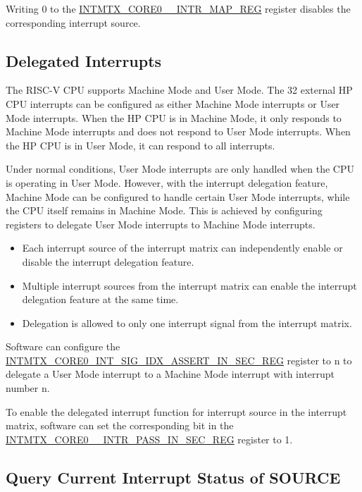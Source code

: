 \documentclass[main\_\_EN.tex]{subfiles}
\begin{document}
Writing 0 to the \hyperref[INTMTXCORE0SOURCEINTRMAPREG]{INTMTX\_CORE0\_\_INTR\_MAP\_REG} register disables the corresponding interrupt source.

\subsection{Delegated Interrupts}

The \chipname{} RISC-V CPU supports Machine Mode and User Mode. The 32 external HP CPU interrupts can be configured as either Machine Mode interrupts or User Mode interrupts. When the HP CPU is in Machine Mode, it only responds to Machine Mode interrupts and does not respond to User Mode interrupts. When the HP CPU is in User Mode, it can respond to all interrupts.

Under normal conditions, User Mode interrupts are only handled when the CPU is operating in User Mode. However, with the interrupt delegation feature, Machine Mode can be configured to handle certain User Mode interrupts, while the CPU itself remains in Machine Mode. This is achieved by configuring registers to delegate User Mode interrupts to Machine Mode interrupts.

\begin{itemize}
\item Each interrupt source of the interrupt matrix can independently enable or disable the interrupt delegation feature.
\item Multiple interrupt sources from the interrupt matrix can enable the interrupt delegation feature at the same time.
\item Delegation is allowed to only one interrupt signal from the interrupt matrix.
\end{itemize}

Software can configure the \hyperref[regdesc:INTMTXCORE0INTSIGIDXASSERTINSECREG]{INTMTX\_CORE0\_INT\_SIG\_IDX\_ASSERT\_IN\_SEC\_REG} register to n to delegate a User Mode interrupt to a Machine Mode interrupt with interrupt number n.

To enable the delegated interrupt function for interrupt source  in the interrupt matrix, software can set the corresponding bit in the \hyperref[INTMTXCORE0SOURCEINTRMAPREG]{INTMTX\_CORE0\_\_INTR\_PASS\_IN\_SEC\_REG} register to 1.

\subsection{Query Current Interrupt Status of SOURCE}
\end{document}
